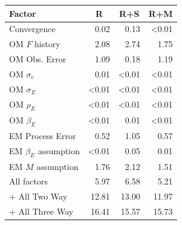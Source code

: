 \begin{center}
\begin{tabular}{lrrr}
\hline\hline
\multicolumn{1}{l}{Factor}&\multicolumn{1}{c}{R}&\multicolumn{1}{c}{R+S}&\multicolumn{1}{c}{R+M}\tabularnewline
\hline
Convergence& 0.02& 0.13&\textless  0.01\tabularnewline
OM $F$ history& 2.08& 2.74& 1.75\tabularnewline
OM Obs. Error& 1.09& 0.18& 1.19\tabularnewline
OM $\sigma_e$& 0.01&\textless  0.01&\textless  0.01\tabularnewline
OM $\sigma_E$&\textless  0.01&\textless  0.01&\textless  0.01\tabularnewline
OM $\rho_{E}$&\textless  0.01&\textless  0.01&\textless  0.01\tabularnewline
OM $\beta_{E}$&\textless  0.01& 0.01&\textless  0.01\tabularnewline
EM Process Error& 0.52& 1.05& 0.57\tabularnewline
EM $\beta_{E}$ assumption&\textless  0.01& 0.05& 0.01\tabularnewline
EM $M$ assumption& 1.76& 2.12& 1.51\tabularnewline
All factors& 5.97& 6.58& 5.21\tabularnewline
+ All Two Way&12.81&13.00&11.97\tabularnewline
+ All Three Way&16.41&15.57&15.73\tabularnewline
\hline
\end{tabular}\end{center}
